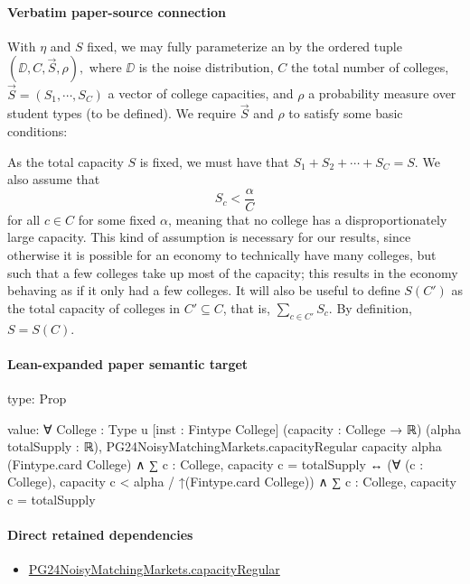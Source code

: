 \documentclass[10pt]{article}
\begin{document}
\paragraph{Verbatim paper-source connection}
\begin{ReviewVerbatim}
With $\eta$ and $S$ fixed, we may fully parameterize an  by the ordered tuple $(\DD, C, \vec{S}, \rho),$ where $\DD$ is the noise distribution, $C$ the total number of colleges, $\vec{S}=(S_1, \cdots, S_C)$ a vector of college capacities, and $\rho$ a probability measure over student types (to be defined). We require $\vec{S}$ and $\rho$ to satisfy some basic conditions:

As the total capacity $S$ is fixed, we must have that $S_1 + S_2 + \cdots + S_C = S.$ We also assume that
\begin{equation}
    S_c < \frac{\alpha}{C}
\end{equation}
for all $c\in C$ for some fixed $\alpha$, meaning that no college has a disproportionately large capacity. This kind of assumption is necessary for our results, since otherwise it is possible for an economy to technically have many colleges, but such that a few colleges take up most of the capacity; this results in the economy behaving as if it only had a few colleges. It will also be useful to define $S(C')$ as the total capacity of colleges in $C'\subseteq C$, that is, $\sum_{c\in C'} S_c.$ By definition, $S = S(C).$
\end{ReviewVerbatim}



\paragraph{Lean-expanded paper semantic target}
\begin{ReviewVerbatim}
type:
Prop

value:
∀ {College : Type u} [inst : Fintype College] (capacity : College → ℝ) (alpha totalSupply : ℝ),
  PG24NoisyMatchingMarkets.capacityRegular capacity alpha (Fintype.card College) ∧
      ∑ c : College, capacity c = totalSupply ↔
    (∀ (c : College), capacity c < alpha / ↑(Fintype.card College)) ∧ ∑ c : College, capacity c = totalSupply
\end{ReviewVerbatim}

\paragraph{Direct retained dependencies}
\begin{itemize}\raggedright
\item \hyperlink{governing-declaration-b45d6cdc9883a614}{PG24\allowbreak{}Noisy\allowbreak{}Matching\allowbreak{}Markets.\allowbreak{}capacity\allowbreak{}Regular}
\end{itemize}
\end{document}
